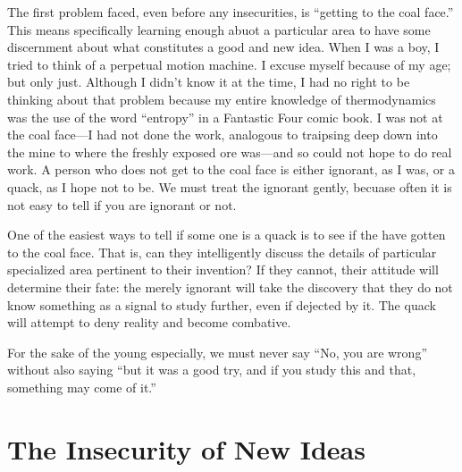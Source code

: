 \documentclass[
	fontsize=10pt, %
	twoside=false, %
	secnumdepth=1, %
]{kaobook}
\begin{document}
The first problem faced, even before any insecurities,
is ``getting to the coal face.''
This means specifically learning enough abuot a particular
area to have some discernment about what constitutes a good and new idea.
When I was a boy, I tried to think of a perpetual motion machine.
I excuse myself because of my age; but only just.
Although I didn't know it at the time, I had no right to be
thinking about that problem because my entire knowledge of
thermodynamics was the use of the word ``entropy'' in a Fantastic Four comic book.
I was not at the coal face---I had not done the work, analogous to traipsing
deep down into the mine to where the freshly exposed ore was---and so could
not hope to do real work.
A person who does not get to the coal face is either ignorant,
as I was, or a quack, as I hope not to be.
We must treat the ignorant gently, becuase often it is not
easy to tell if you are ignorant or not.

One of the easiest ways to tell if some one is a quack is
to see if the have gotten to the coal face.
That is, can they intelligently discuss the details
of particular specialized area pertinent to their invention?
If they cannot, their attitude will determine their fate:
the merely ignorant will take the discovery that they
do not know something as a signal to study further, even if dejected by it.
The quack will attempt to deny reality and become combative.

For the sake of the young especially, we must never say
``No, you are wrong'' without also saying ``but it was
a good try, and if you study this and that, something may come of it.''


\section{The Insecurity of New Ideas}
\end{document}
